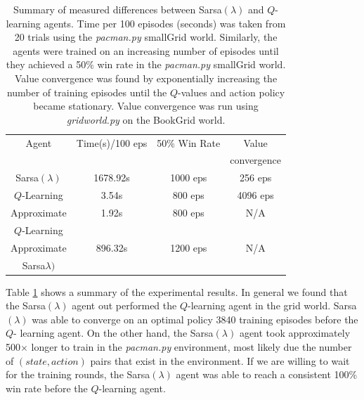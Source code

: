\documentclass[10pt,conference]{IEEEtran}
\begin{document}
	\begin{table}
		\begin{tabular}{|c|c|c|c|}
			\hline
			Agent & Time(s)/100 eps & 50\% Win Rate & Value \\
			& & & convergence \\
			\hline \hline
			Sarsa\((\lambda)\) & 1678.92s & 1000 eps & 256 eps \\
			\hline
			\(Q\)-Learning & 3.54s & 800 eps & 4096 eps \\
			\hline
			Approximate & 1.92s & 800 eps & N/A \\
			\(Q\)-Learning & & & \\
			\hline
			Approximate & 896.32s & 1200 eps & N/A \\
			Sarsa\(\lambda)\) & & & \\
			\hline
		\end{tabular}
		\caption{Summary of measured differences between Sarsa\((\lambda)\)
		and \(Q\)-learning agents.  Time per 100 episodes (seconds) was 
		taken from 20 trials using the \textit{pacman.py} smallGrid world.  
		Similarly, the agents were trained on an increasing number of episodes until 
		they achieved a 50\% win rate in the \textit{pacman.py} smallGrid 
		world.  Value convergence was found by exponentially increasing 
		the number of training episodes until the \(Q\)-values and 
		action policy became stationary.  Value convergence was run
		using \textit{gridworld.py} on the BookGrid world.}
		\label{summary}
	\end{table}
			
	Table \ref{summary} shows a summary of the experimental results.  In 
	general we found that the Sarsa\((\lambda)\) agent out performed the 
	\(Q\)-learning agent in the grid world.  Sarsa\((\lambda)\) was able to 
	converge on an optimal policy 3840 training episodes before the \(Q\)-
	learning agent.  On the other hand, the Sarsa\((\lambda)\) agent took approximately
	500\(\times\) longer to train in the \textit{pacman.py} environment, most 
	likely due the number of \((state, action)\) pairs that exist in the 
	environment.  If we are willing to wait for the training rounds, the 
	Sarsa\((\lambda)\) agent was able to reach a consistent 100\% win rate before
	the \(Q\)-learning agent. 
\end{document}

